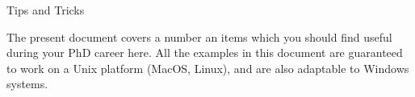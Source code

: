 \begin{huge}
\begin{center}
Tips and Tricks
\end{center}
\end{huge}
The present document covers a number an items which you should find useful during your PhD career here. All the examples in this document are guaranteed to work on a Unix platform (MacOS, Linux), and are also adaptable to Windows systems.\\
\toccontents
